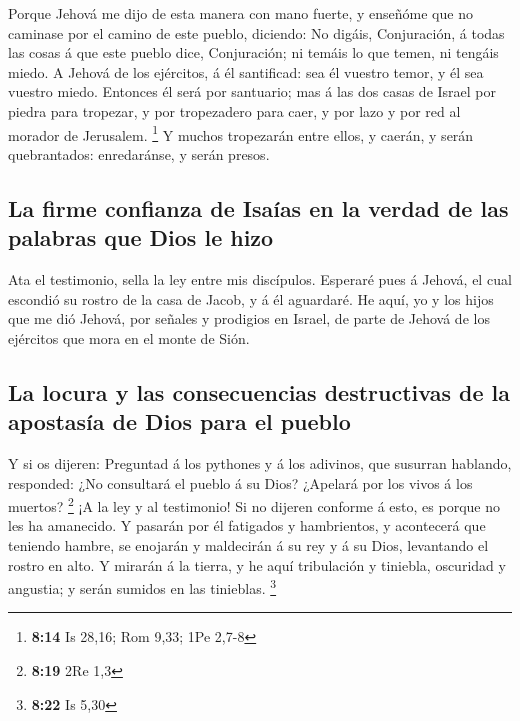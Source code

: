  Porque Jehová me dijo de esta manera con mano fuerte, y
enseñóme que no caminase por el camino de este pueblo, diciendo:
 No digáis, Conjuración, á todas las cosas á que este
pueblo dice, Conjuración; ni temáis lo que temen, ni tengáis miedo.
 A Jehová de los ejércitos, á él santificad: sea él
vuestro temor, y él sea vuestro miedo.  Entonces él será
por santuario; mas á las dos casas de Israel por piedra para tropezar, y
por tropezadero para caer, y por lazo y por red al morador de Jerusalem.
\footnote{\textbf{8:14} Is 28,16; Rom 9,33; 1Pe 2,7-8}  Y
muchos tropezarán entre ellos, y caerán, y serán quebrantados:
enredaránse, y serán presos.

\hypertarget{la-firme-confianza-de-isauxedas-en-la-verdad-de-las-palabras-que-dios-le-hizo}{%
\subsection{La firme confianza de Isaías en la verdad de las palabras
que Dios le
hizo}\label{la-firme-confianza-de-isauxedas-en-la-verdad-de-las-palabras-que-dios-le-hizo}}

 Ata el testimonio, sella la ley entre mis discípulos.
 Esperaré pues á Jehová, el cual escondió su rostro de la
casa de Jacob, y á él aguardaré.  He aquí, yo y los hijos
que me dió Jehová, por señales y prodigios en Israel, de parte de Jehová
de los ejércitos que mora en el monte de Sión.

\hypertarget{la-locura-y-las-consecuencias-destructivas-de-la-apostasuxeda-de-dios-para-el-pueblo}{%
\subsection{La locura y las consecuencias destructivas de la apostasía
de Dios para el
pueblo}\label{la-locura-y-las-consecuencias-destructivas-de-la-apostasuxeda-de-dios-para-el-pueblo}}

 Y si os dijeren: Preguntad á los pythones y á los
adivinos, que susurran hablando, responded: ¿No consultará el pueblo á
su Dios? ¿Apelará por los vivos á los muertos? \footnote{\textbf{8:19}
  2Re 1,3}  ¡A la ley y al testimonio! Si no dijeren
conforme á esto, es porque no les ha amanecido.  Y
pasarán por él fatigados y hambrientos, y acontecerá que teniendo
hambre, se enojarán y maldecirán á su rey y á su Dios, levantando el
rostro en alto.  Y mirarán á la tierra, y he aquí
tribulación y tiniebla, oscuridad y angustia; y serán sumidos en las
tinieblas. \footnote{\textbf{8:22} Is 5,30}

